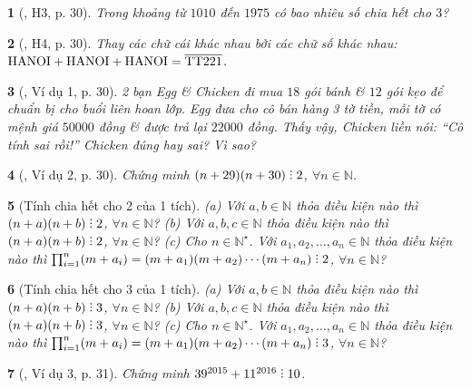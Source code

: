 \documentclass{article}
\newtheorem{baitoan}{}
\DeclareRobustCommand{\divby}{%
	\mathrel{\vbox{\baselineskip.65ex\lineskiplimit0pt\hbox{.}\hbox{.}\hbox{.}}}%
}
\begin{document}
\begin{baitoan}[\cite{Binh_boi_duong_Toan_6_tap_1}, H3, p. 30]
	Trong khoảng từ $1010$ đến $1975$ có bao nhiêu số chia hết cho $3$?
\end{baitoan}

\begin{baitoan}[\cite{Binh_boi_duong_Toan_6_tap_1}, H4, p. 30]
	Thay các chữ cái khác nhau bởi các chữ số khác nhau: $\rm HANOI + HANOI + HANOI = \overline{TT221}$.
\end{baitoan}

\begin{baitoan}[\cite{Binh_boi_duong_Toan_6_tap_1}, Ví dụ 1, p. 30]
	2 bạn Egg \& Chicken đi mua $18$ gói bánh \& $12$ gói kẹo để chuẩn bị cho buổi liên hoan lớp. Egg đưa cho cô bán hàng 3 tờ tiền, mỗi tờ có mệnh giá $50000$ đồng \& được trả lại $22000$ đồng. Thấy vậy, Chicken liền nói: ``Cô tính sai rồi!'' Chicken đúng hay sai? Vì sao?
\end{baitoan}

\begin{baitoan}[\cite{Binh_boi_duong_Toan_6_tap_1}, Ví dụ 2, p. 30]
	Chứng minh $(n + 29)(n + 30)\divby2$, $\forall n\in\mathbb{N}$.
\end{baitoan}

\begin{baitoan}[Tính chia hết cho 2 của 1 tích]
	(a) Với $a,b\in\mathbb{N}$ thỏa điều kiện nào thì $(n + a)(n + b)\divby2$, $\forall n\in\mathbb{N}$? (b) Với $a,b,c\in\mathbb{N}$ thỏa điều kiện nào thì $(n + a)(n + b)\divby2$, $\forall n\in\mathbb{N}$? (c) Cho $n\in\mathbb{N}^\star$. Với $a_1,a_2,\ldots,a_n\in\mathbb{N}$ thỏa điều kiện nào thì $\prod_{i=1}^n (m + a_i) = (m + a_1)(m + a_2)\cdots(m + a_n)\divby2$, $\forall n\in\mathbb{N}$?
\end{baitoan}

\begin{baitoan}[Tính chia hết cho 3 của 1 tích]
	(a) Với $a,b\in\mathbb{N}$ thỏa điều kiện nào thì $(n + a)(n + b)\divby3$, $\forall n\in\mathbb{N}$? (b) Với $a,b,c\in\mathbb{N}$ thỏa điều kiện nào thì $(n + a)(n + b)\divby3$, $\forall n\in\mathbb{N}$? (c) Cho $n\in\mathbb{N}^\star$. Với $a_1,a_2,\ldots,a_n\in\mathbb{N}$ thỏa điều kiện nào thì $\prod_{i=1}^n (m + a_i) = (m + a_1)(m + a_2)\cdots(m + a_n)\divby3$, $\forall n\in\mathbb{N}$?
\end{baitoan}

\begin{baitoan}[\cite{Binh_boi_duong_Toan_6_tap_1}, Ví dụ 3, p. 31]
	Chứng minh $39^{2015} + 11^{2016}\divby10$.
\end{baitoan}
\end{document}
